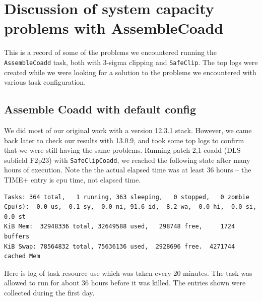\documentclass[DM,toc]{lsstdoc}
\begin{document}


\appendix
\section{Discussion of system capacity problems with AssembleCoadd}
This is a record of some of the problems we encountered running the {\tt\string AssembleCoadd} task, both with 3-sigma clipping and {\tt\string SafeClip}. The top logs were created while we were looking for a solution to the problems we encountered with various task configuration.
\subsection{Assemble Coadd with default config}
We did most of our original work with a version 12.3.1 stack.  However, we came back later to check our results with 13.0.9, and took some top logs to confirm that we were still having the same problems.  Running patch 2,1 coadd (DLS subfield F2p23) with {\tt\string SafeClipCoadd}, we reached the following state after many hours of execution.  Note the the actual elapsed time was at least 36 hours -- the TIME+ entry is cpu time, not elapsed time.

\begin{small}
\begin{verbatim}
Tasks: 364 total,   1 running, 363 sleeping,   0 stopped,   0 zombie
Cpu(s):  0.0 us,  0.1 sy,  0.0 ni, 91.6 id,  8.2 wa,  0.0 hi,  0.0 si,  0.0 st
KiB Mem:  32948336 total, 32649588 used,   298748 free,     1724 buffers
KiB Swap: 78564832 total, 75636136 used,  2928696 free.  4271744 cached Mem
\end{verbatim}
\end{small}

Here is log of task resource use which was taken every 20 minutes. The task was allowed to run for about 36 hours before it was killed. The entries shown were collected during the first day.
\end{document}
